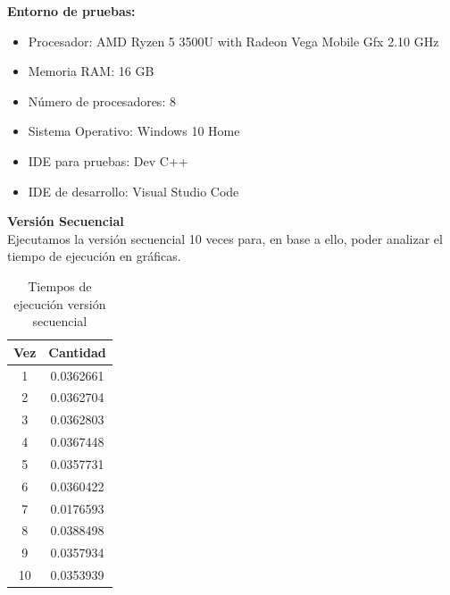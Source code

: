 \documentclass[12pt, letterpaper]{article}
\begin{document}
\vspace{10mm}
\begin{flushleft}
    \textbf{Entorno de pruebas:}
    \begin{itemize}
        \item Procesador: AMD Ryzen 5 3500U with Radeon Vega Mobile Gfx  2.10 GHz
        \item Memoria RAM: 16 GB
        \item Número de procesadores: 8
        \item Sistema Operativo: Windows 10 Home
        \item IDE para pruebas: Dev C++
        \item IDE de desarrollo: Visual Studio Code
    \end{itemize}
    \textbf{Versión Secuencial}\\
    Ejecutamos la versión secuencial 10 veces para, en base a ello, poder analizar el tiempo de ejecución en gráficas.
    \begin{table}[h]
        \begin{center}
            \begin{tabular}{| c | c |}
                \hline
                Vez & Cantidad \\ \hline
                1 & 0.0362661 \\\hline
                2 & 0.0362704 \\\hline
                3 & 0.0362803 \\ \hline
                4 & 0.0367448 \\ \hline
                5 & 0.0357731 \\ \hline
                6 & 0.0360422 \\ \hline
                7 & 0.0176593 \\ \hline
                8 & 0.0388498 \\ \hline
                9 & 0.0357934 \\ \hline
                10 & 0.0353939 \\ \hline
            \end{tabular}
            \caption{Tiempos de ejecución versión secuencial}
            \label{tab:sec}
        \end{center}
    \end{table}
\end{flushleft}
\end{document}
